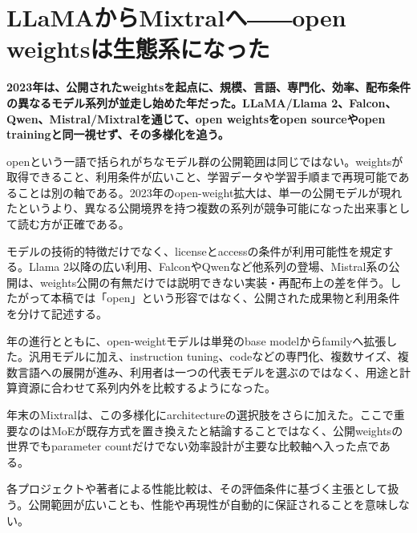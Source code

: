 \section{LLaMAからMixtralへ――open weightsは生態系になった}
\noindent\textbf{2023年は、公開されたweightsを起点に、規模、言語、専門化、効率、配布条件の異なるモデル系列が並走し始めた年だった。LLaMA/Llama 2、Falcon、Qwen、Mistral/Mixtralを通じて、open weightsをopen sourceやopen trainingと同一視せず、その多様化を追う。}\autocite{src-00c370ab2324,src-1fd43f93adcc,src-240ca564b6b8,src-3db09fede330,src-5c8e2db8871a,src-74aa7e2a7ca4,src-81f670ec1e74,src-8bdb904686fb,src-9df482e2c96c,src-b7e5243e6d59,src-bc7aba201f01,src-d4b6359bbad1,src-dd2cfa98160d,src-f0349196879e}

openという一語で括られがちなモデル群の公開範囲は同じではない。weightsが取得できること、利用条件が広いこと、学習データや学習手順まで再現可能であることは別の軸である。2023年のopen-weight拡大は、単一の公開モデルが現れたというより、異なる公開境界を持つ複数の系列が競争可能になった出来事として読む方が正確である。\autocite{src-00c370ab2324,src-1fd43f93adcc,src-240ca564b6b8,src-3db09fede330,src-5c8e2db8871a,src-74aa7e2a7ca4,src-81f670ec1e74,src-8bdb904686fb,src-9df482e2c96c,src-b7e5243e6d59,src-bc7aba201f01,src-d4b6359bbad1,src-dd2cfa98160d,src-f0349196879e}


モデルの技術的特徴だけでなく、licenseとaccessの条件が利用可能性を規定する。Llama 2以降の広い利用、FalconやQwenなど他系列の登場、Mistral系の公開は、weights公開の有無だけでは説明できない実装・再配布上の差を伴う。したがって本稿では「open」という形容ではなく、公開された成果物と利用条件を分けて記述する。\autocite{src-00c370ab2324,src-1fd43f93adcc,src-240ca564b6b8,src-3db09fede330,src-5c8e2db8871a,src-74aa7e2a7ca4,src-81f670ec1e74,src-8bdb904686fb,src-9df482e2c96c,src-b7e5243e6d59,src-bc7aba201f01,src-d4b6359bbad1,src-dd2cfa98160d,src-f0349196879e}


年の進行とともに、open-weightモデルは単発のbase modelからfamilyへ拡張した。汎用モデルに加え、instruction tuning、codeなどの専門化、複数サイズ、複数言語への展開が進み、利用者は一つの代表モデルを選ぶのではなく、用途と計算資源に合わせて系列内外を比較するようになった。\autocite{src-00c370ab2324,src-240ca564b6b8,src-3db09fede330,src-5c8e2db8871a,src-8bdb904686fb,src-9df482e2c96c,src-b7e5243e6d59,src-bc7aba201f01,src-d4b6359bbad1,src-dd2cfa98160d,src-f0349196879e}


年末のMixtralは、この多様化にarchitectureの選択肢をさらに加えた。ここで重要なのはMoEが既存方式を置き換えたと結論することではなく、公開weightsの世界でもparameter countだけでない効率設計が主要な比較軸へ入った点である。\autocite{src-00c370ab2324,src-dd2cfa98160d,src-f0349196879e}


\begin{claimboundary}
各プロジェクトや著者による性能比較は、その評価条件に基づく主張として扱う。公開範囲が広いことも、性能や再現性が自動的に保証されることを意味しない。\autocite{src-240ca564b6b8,src-3db09fede330,src-8bdb904686fb,src-9df482e2c96c,src-b7e5243e6d59,src-bc7aba201f01}
\end{claimboundary}
